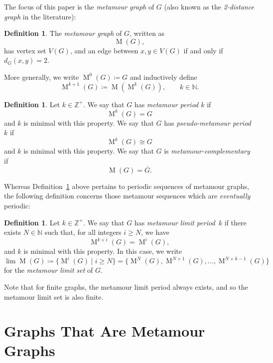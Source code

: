 \documentclass[12pt]{amsart}
\theoremstyle{definition}
\newtheorem{definition}[theorem]{Definition}
\theoremstyle{remark}
\numberwithin{equation}{section}
\numberwithin{figure}{section}
\newcommand{\M}{\operatorname{M}}
\newcommand{\N}{\mathbb{N}}
\newcommand{\Z}{\mathbb{Z}}
\begin{document}
The focus of this paper is the \emph{metamour graph} of $G$ (also known as the \emph{2-distance graph} in the literature):

\begin{definition}\label{def: M}
    The \emph{metamour graph} of $G$, written as
        \[ \M(G),\]
    has vertex set $V(G)$, and an edge between $x,y\in V(G)$ if and only if $d_G(x,y) = 2$. 

    More generally, we write $\M^0(G) \coloneqq G$ and inductively define
        \[ \M^{k+1}(G) \coloneqq \M(\M^{k}(G)), \qquad k \in \N. \]
\end{definition}

\begin{definition}
\label{def:intro}
    Let $k\in\Z^+$. 
    We say that $G$ has \emph{metamour period $k$} if
    \[ \M^k(G) = G\]
    and $k$ is minimal with this property.
    We say that $G$ has \emph{pseudo-metamour period $k$} if
    \[ \M^k(G) \cong G \]
    and $k$ is minimal with this property.
    We say that $G$ is \emph{metamour-complementary} if
    \[ \M(G) = \overline{G}.\]
\end{definition}

Whereas Definition~\ref{def:intro} above pertains to periodic sequences of metamour graphs, the following definition concerns those metamour sequences which are \emph{eventually} periodic:

\begin{definition}
    Let $k\in\Z^+$. We say that $G$ has \emph{metamour limit period~$k$} if there exists $N \in \N$ such that, for all integers $i \geq N$, we have
    \[ \M^{k+i}(G) = \M^i(G), \]
    and $k$ is minimal with this property. In this case, we write
    \[ \lim \M(G) \coloneqq \{ \M^i(G) \mid  i \geq N\} =
        \{ \M^N(G), \M^{N+1}(G), \ldots, \M^{N+k-1}(G) \} \]
    for the \emph{metamour limit set} of $G$.
\end{definition}

Note that for finite graphs, the metamour limit period always exists, and so the metamour limit set is also finite.


\section{Graphs That Are Metamour Graphs}
\end{document}

